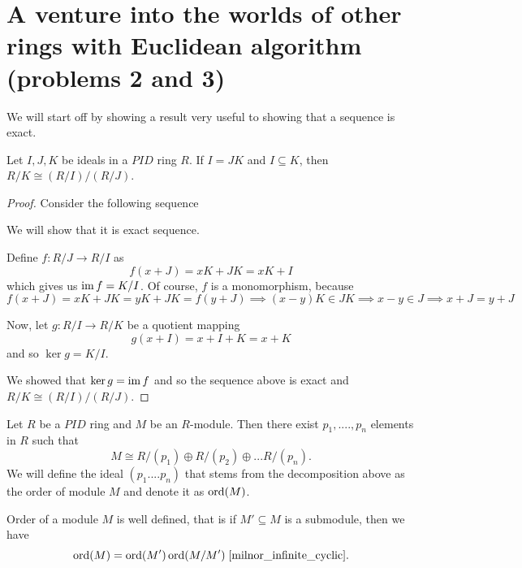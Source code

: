 
\section{A venture into the worlds of other rings with Euclidean algorithm (problems 2 and 3)}

We will start off by showing a result very useful to showing that a sequence is exact.

\begin{lemma}\label{dzielenie przez quotient rings}
  Let $I, J, K$ be ideals in a $PID$ ring $R$. If $I=JK$ and $I\subseteq K$, then $R/K\cong (R/I)/(R/J)$.
\end{lemma}

\begin{proof}
  Consider the following sequence
  \begin{center}\end{center}
  We will show that it is exact sequence.

  Define $f:R/J\to R/I$ as
  $$f(x+J)=xK+JK=xK+I$$
  which gives us $\operatorname{im} f=K/I$. Of course, $f$ is a monomorphism, because
  $$f(x+J)=xK+JK=yK+JK=f(y+J)\implies (x-y)K\in JK\implies x-y\in J\implies x+J=y+J$$

  Now, let $g:R/I\to R/K$ be a quotient mapping
  $$g(x+I)=x+I+K=x+K$$ 
  and so $\ker g=K/I$.

  We showed that $\ker g=\operatorname{im} f$ and so the sequence above is exact and $R/K\cong (R/I)/(R/J)$.
\end{proof}

\begin{theorem}\label{decomposition theorem def order}
  Let $R$ be a $PID$ ring and $M$ be an $R$-module. Then there exist $p_1,....,p_n$ elements in $R$ such that 
  $$M\cong R/(p_1)\oplus R/(p_2)\oplus...R/(p_n).$$
  We will define the ideal $(p_1....p_n)$ that stems from the decomposition above as the order of module $M$ and denote it as $\operatorname{ord}(M)$. 

  Order of a module $M$ is well defined, that is if $M'\subseteq M$ is a submodule, then we have 
  $$\operatorname{ord}(M)=\operatorname{ord}(M')\operatorname{ord}(M/M')\;\cite{milnor_infinite_cyclic}.$$
\end{theorem}


